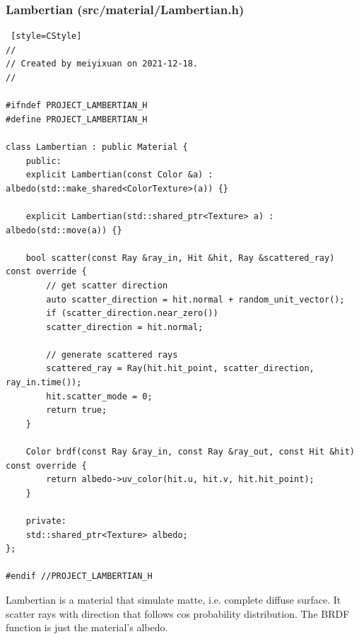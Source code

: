 \documentclass[utf8]{article}
\begin{document}
\subsubsection{Lambertian (src/material/Lambertian.h)}
\begin{lstlisting} [style=CStyle]
//
// Created by meiyixuan on 2021-12-18.
//

#ifndef PROJECT_LAMBERTIAN_H
#define PROJECT_LAMBERTIAN_H

class Lambertian : public Material {
	public:
	explicit Lambertian(const Color &a) : albedo(std::make_shared<ColorTexture>(a)) {}
	
	explicit Lambertian(std::shared_ptr<Texture> a) : albedo(std::move(a)) {}
	
	bool scatter(const Ray &ray_in, Hit &hit, Ray &scattered_ray) const override {
		// get scatter direction
		auto scatter_direction = hit.normal + random_unit_vector();
		if (scatter_direction.near_zero())
		scatter_direction = hit.normal;
		
		// generate scattered rays
		scattered_ray = Ray(hit.hit_point, scatter_direction, ray_in.time());
		hit.scatter_mode = 0;
		return true;
	}
	
	Color brdf(const Ray &ray_in, const Ray &ray_out, const Hit &hit) const override {
		return albedo->uv_color(hit.u, hit.v, hit.hit_point);
	}
	
	private:
	std::shared_ptr<Texture> albedo;
};

#endif //PROJECT_LAMBERTIAN_H

\end{lstlisting}
Lambertian is a material that simulate matte, i.e. complete diffuse surface. It scatter rays with direction that follows cos probability distribution. The BRDF function is just the material's albedo.
\end{document}

